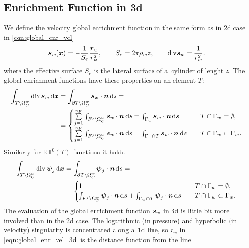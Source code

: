 \subsection{Enrichment Function in 3d}
We define the velocity global enrichment function in the same form as in 2d case in \eqref{eqn:global_enr_vel}
\begin{equation}
    \mathbf{\boldsymbol{s}}_w(\mathbf{\boldsymbol{x}}) = -\frac{1}{S_e} \frac{\mathbf{\boldsymbol{r}}_w}{r_w^2}, \qquad S_e = 2\pi\rho_w z
    , \qquad {\rm div} \mathbf{\boldsymbol{s}}_w = \frac{1}{r_w^2}.
    \label{eqn:global_enr_vel_3d}
\end{equation}
%
where the effective surface $S_e$ is the lateral surface of a~cylinder of lenght $z$.
The global enrichment functions have these properties on an element $T$:
\begin{align} \label{eqn:glob_flux_properties_3d}
    \int_{T\setminus \Omega^w_C} {\rm div}\,\mathbf{\boldsymbol{s}}_w \,{\rm d}\mathbf{\boldsymbol{x}}
    &= \int_{\partial T\setminus\Omega^w_C} \mathbf{\boldsymbol{s}}_w\cdot\mathbf{\boldsymbol{n}} \,{\rm d} s = \nonumber\\
    &= \begin{cases}
        \sum \limits_{j=1}^{n_F} \int_{F^j\setminus\Omega^w_C} \mathbf{\boldsymbol{s}}_w\cdot\mathbf{\boldsymbol{n}} \,{\rm d} s = 
            \int_{\Gamma_w} \mathbf{\boldsymbol{s}}_w\cdot\mathbf{\boldsymbol{n}} \,{\rm d} s
            &\quad T \cap \Gamma_w=\emptyset, \\
        \sum \limits_{j=1}^{n_F} \int_{F^j\setminus \Omega^w_C} \mathbf{\boldsymbol{s}}_w\cdot\mathbf{\boldsymbol{n}} \,{\rm d} s 
        = \int_{\Gamma_w\cap T} \mathbf{\boldsymbol{s}}_w\cdot\mathbf{\boldsymbol{n}} \,{\rm d} s &\quad T \cap \Gamma_w\subset\Gamma_w. \\
    \end{cases}
\end{align}
% 
Similarly for $\mathbb{RT}^0(T)$ functions it holds
\begin{align} \label{eqn:rt0_flux_properties_3d}
    \int_{T\setminus \Omega^w_C} {\rm div}\,\mathbf{\boldsymbol{\psi}}_{j}\,{\rm d}\mathbf{\boldsymbol{x}}
    &= \int_{\partial T\setminus \Omega^w_C} \mathbf{\boldsymbol{\psi}}_{j}\cdot\mathbf{\boldsymbol{n}} \,{\rm d} s = \nonumber\\
    &= \begin{cases}
        1 & \quad T \cap \Gamma_w=\emptyset, \\
        \int_{F^j\setminus \Omega^w_C} \mathbf{\boldsymbol{\psi}}_j\cdot\mathbf{\boldsymbol{n}} \,{\rm d} s
            +\int_{\Gamma_w\cap T} \mathbf{\boldsymbol{\psi}}_j\cdot\mathbf{\boldsymbol{n}} \,{\rm d} s
            &\quad T \cap \Gamma_w\subset\Gamma_w. \\
        \end{cases}
\end{align}
%
%
The evaluation of the global enrichment function $\mathbf{\boldsymbol{s}}_w$ in 3d is little bit more involved than in the 2d case.
The logarithmic (in pressure) and hyperbolic (in velocity) singularity is concentrated along a~1d line,
so $r_w$ in \eqref{eqn:global_enr_vel_3d} is the distance function from the line.

